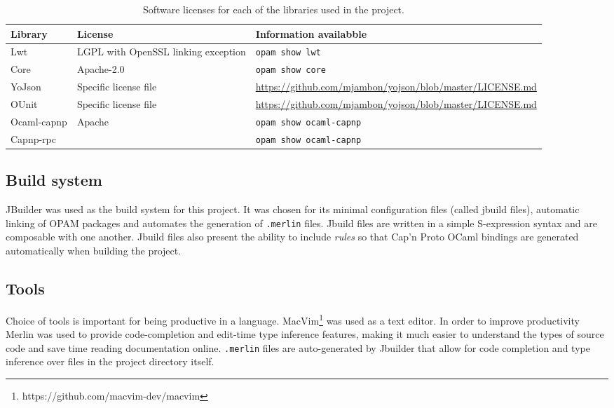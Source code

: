 \begin{table}
\centering
\begin{tabular}{ | l  | p{3.0cm}| p{7.0cm} | } \hline
   \textbf{Library} & \textbf{License} & \textbf{Information availabble} \\ \hline
    Lwt & LGPL with OpenSSL linking exception & \texttt{opam show lwt} \\ \hline
    Core & Apache-2.0 & \texttt{opam show core} \\ \hline
    YoJson & Specific license file & \url{https://github.com/mjambon/yojson/blob/master/LICENSE.md} \\ \hline
    OUnit & Specific license file & \url{https://github.com/mjambon/yojson/blob/master/LICENSE.md} \\ \hline
    Ocaml-capnp & Apache &  \texttt{opam show ocaml-capnp} \\
    Capnp-rpc & & \texttt{opam show ocaml-capnp} \\ \hline
\end{tabular}
\caption{Software licenses for each of the libraries used in the project.}
\label{table:software-licenses}
\end{table}

\subsection{Build system}
JBuilder was used as the build system for this project. It was chosen for its minimal configuration files (called jbuild files), automatic linking of OPAM packages and automates the generation of \texttt{.merlin} files. Jbuild files are written in a simple S-expression syntax and are composable with one another. Jbuild files also present the ability to include \emph{rules} so that Cap'n Proto OCaml bindings are generated automatically when building the project.

\subsection{Tools}
  
Choice of tools is important for being productive in a language. MacVim\footnote{https://github.com/macvim-dev/macvim} was used as a text editor. In order to improve productivity Merlin was used to provide code-completion and edit-time type inference features, making it much easier to understand the types of source code and save time reading documentation online. \texttt{.merlin} files are auto-generated by Jbuilder that allow for code completion and type inference over files in the project directory itself. \\


